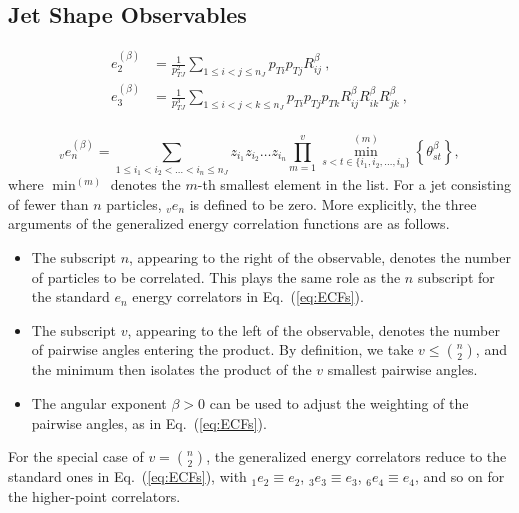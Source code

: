 \documentclass[11pt,letterpaper]{article}
\DeclareRobustCommand{\Eq}[1]{Eq.~(\ref{#1})}
\newcommand{\ecf}[2]{e_{#1}^{(#2)}}
\newcommand{\ecfnobeta}[1]{e_{#1}}
\newcommand{\ecfvar}[3]{{_{#1}e_{#2}^{(#3)}}}
\newcommand{\ecfvarnobeta}[2]{{_{#1}e_{#2}}}
\begin{document}
\subsection{Jet Shape Observables}





\cite{Moult:2016cvt}

\begin{align}
\ecf{2}{\beta} &= \frac{1}{p_{TJ}^2}\sum_{1\leq i<j\leq n_J} p_{Ti}p_{Tj} R_{ij}^\beta \ ,\nonumber \\
\ecf{3}{\beta} &= \frac{1}{p_{TJ}^3}\sum_{1\leq i<j<k\leq n_J} p_{Ti}p_{Tj}p_{Tk} R_{ij}^\beta R_{ik}^\beta R_{jk}^\beta \ , \nonumber \\
\end{align}


\begin{equation}\label{eq:ecf_gen}
\ecfvar{v}{n}{\beta} = \sum_{1 \leq i_1 < i_2 < \dots < i_n \leq n_J} z_{i_1} z_{i_2} \dots z_{i_n} \prod_{m = 1}^{v} \min^{(m)}_{s < t \in \{i_1, i_2 , \dots, i_n \}} \left\{ \theta_{st}^{\beta} \right\},
\end{equation}
where $\min^{(m)}$ denotes the $m$-th smallest element in the list.  For a jet consisting of fewer than $n$ particles, $\ecfvarnobeta{v}{n}$ is defined to be zero.  More explicitly, the three arguments of the generalized energy correlation functions are as follows.
\begin{itemize}
\item The subscript $n$, appearing to the right of the observable, denotes the number of particles to be correlated.  This plays the same role as the $n$ subscript for the standard $e_n$ energy correlators in \Eq{eq:ECFs}. 
\item The subscript $v$, appearing to the left of the observable, denotes the number of pairwise angles entering the product.  By definition, we take $v \leq \binom{n}{2}$, and the minimum then isolates the product of the $v$ smallest pairwise angles.
\item The angular exponent $\beta>0$ can be used to adjust the weighting of the pairwise angles, as in \Eq{eq:ECFs}.
\end{itemize}
For the special case of $v = \binom{n}{2}$, the generalized energy correlators reduce to the standard ones in \Eq{eq:ECFs}, with $\ecfvarnobeta{1}{2}\equiv\ecfnobeta{2}$, $\ecfvarnobeta{3}{3}\equiv\ecfnobeta{3}$, $\ecfvarnobeta{6}{4}\equiv\ecfnobeta{4}$, and so on for the higher-point correlators. 
\end{document}
